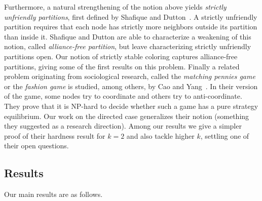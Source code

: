 \documentclass{llncs}
\begin{document}
Furthermore, a natural strengthening of the notion above yields \emph{strictly
unfriendly partitions}, first defined by Shafique and
Dutton~\cite{ShafiqueD09}.  A strictly unfriendly partition requires that each
node has strictly more neighbors outside its partition than inside it.
Shafique and Dutton are able to characterize a weakening of this notion, called
\emph{alliance-free partition}, but leave characterizing strictly unfriendly partitions open.  Our
notion of strictly stable coloring captures alliance-free partitions, giving
some of the first results on this problem.
Finally a related problem originating from sociological research, called the
\emph{matching pennies game} or the \emph{fashion game} is studied, among
others, by Cao and Yang~\cite{CaoY12a}.  In their version of the game, some
nodes try to coordinate and others try to anti-coordinate.  They prove that it
is NP-hard to decide whether such a game has a pure strategy equilibrium.  Our
work on the directed case generalizes their notion (something they suggested as
a research direction).  Among our results we give a simpler proof of their
hardness result for $k=2$ and also tackle higher $k$, settling one of their open
questions.

\subsection{Results}

Our main results are as follows.
\end{document}

